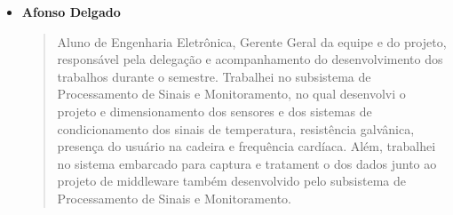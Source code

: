 \begin{itemize}
    \item \textbf{Afonso Delgado}
    \begin{quote}
      Aluno de Engenharia Eletrônica, Gerente Geral da equipe e do projeto, 
      responsável pela delegação e acompanhamento do desenvolvimento dos 
      trabalhos durante o semestre. Trabalhei no subsistema de Processamento 
      de Sinais e Monitoramento, no qual desenvolvi o projeto e dimensionamento 
      dos sensores e dos sistemas de condicionamento dos sinais de temperatura, 
      resistência galvânica, presença do usuário na cadeira e frequência 
      cardíaca. Além, trabalhei no sistema embarcado para captura e tratament
      o dos dados junto ao projeto de middleware também desenvolvido pelo 
      subsistema de Processamento de Sinais e Monitoramento.
    \end{quote}
\end{itemize}
